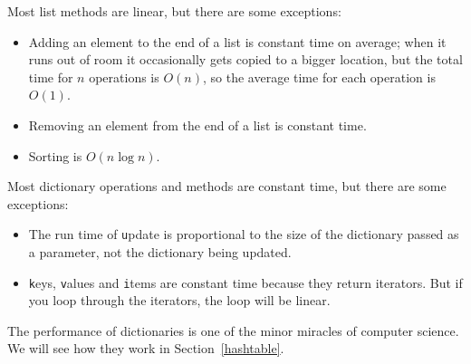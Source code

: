 \documentclass[
DIV=11,
fontsize=13,
twoside,
headinclude=false,
titlepage=firstiscover,
abstract=true,
headsepline=true,
footsepline=true,
chapterprefix=true, %
headings=big,
bibliography=totoc,%
captions=tableheading
]{scrbook}
\theoremstyle{definition}
\begin{document}
Most list methods are linear, but there are some exceptions:

\begin{itemize}

\item Adding an element to the end of a list is constant time on
average; when it runs out of room it occasionally gets copied
to a bigger location, but the total time for $n$ operations
is $O(n)$, so the average time for each
operation is $O(1)$.

\item Removing an element from the end of a list is constant time.

\item Sorting is $O(n \log n)$.

\end{itemize}

Most dictionary operations and methods are constant time, but
there are some exceptions:

\begin{itemize}

\item The run time of {\texttt update} is
  proportional to the size of the dictionary passed as a parameter,
  not the dictionary being updated.

\item {\texttt keys}, {\texttt values} and {\texttt items} are constant time because 
  they return iterators.  But
  if you loop through the iterators, the loop will be linear.

\end{itemize}

The performance of dictionaries is one of the minor miracles of
computer science.  We will see how they work in
Section~\ref{hashtable}.
\end{document}
